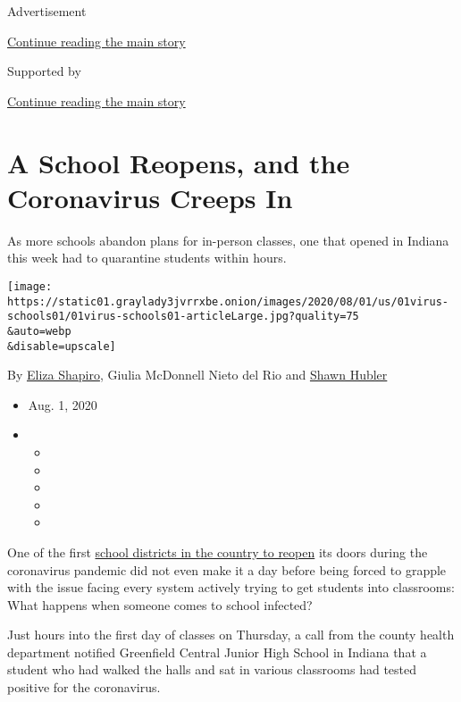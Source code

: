 Advertisement

\protect\hyperlink{after-top}{Continue reading the main story}

Supported by

\protect\hyperlink{after-sponsor}{Continue reading the main story}

\hypertarget{a-school-reopens-and-the-coronavirus-creeps-in}{%
\section{A School Reopens, and the Coronavirus Creeps
In}\label{a-school-reopens-and-the-coronavirus-creeps-in}}

As more schools abandon plans for in-person classes, one that opened in
Indiana this week had to quarantine students within hours.

\texttt{[image: https://static01.graylady3jvrrxbe.onion/images/2020/08/01/us/01virus-schools01/01virus-schools01-articleLarge.jpg?quality=75\\\&auto=webp\\\&disable=upscale]}

By \href{https://www.nytimes3xbfgragh.onion/by/eliza-shapiro}{Eliza
Shapiro}, Giulia McDonnell Nieto del Rio and
\href{https://www.nytimes3xbfgragh.onion/by/shawn-hubler}{Shawn Hubler}

\begin{itemize}
\item
  Aug. 1, 2020
\item
  \begin{itemize}
  \item
  \item
  \item
  \item
  \item
  \end{itemize}
\end{itemize}

One of the first
\href{https://www.nytimes3xbfgragh.onion/2020/08/03/us/school-closing-coronavirus.html}{school
districts in the country to reopen} its doors during the coronavirus
pandemic did not even make it a day before being forced to grapple with
the issue facing every system actively trying to get students into
classrooms: What happens when someone comes to school infected?

Just hours into the first day of classes on Thursday, a call from the
county health department notified Greenfield Central Junior High School
in Indiana that a student who had walked the halls and sat in various
classrooms had tested positive for the coronavirus.

